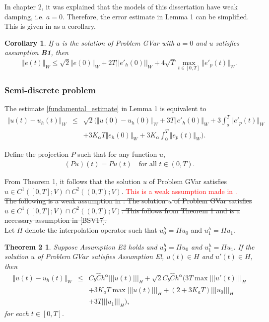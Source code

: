 \documentclass[../../main.tex]{subfiles}
\begin{document}
In chapter 2, it was explained that the models of this dissertation have weak damping, i.e. $a = 0$. Therefore, the error estimate in Lemma 1 can be simplified. This is given in \cite{BV13} as a corollary.

\newtheorem{col_1}{Corollary}
\begin{col_1}
	If $u$ is the solution of Problem GVar with $a = 0$ and $u$ satisfies assumption \textbf{B1}, then
	\begin{eqnarray}
		\Vert e(t)\Vert_{W} \leq \sqrt{2} \Vert e(0) \Vert_W + 2T||e'_h(0)||_W + 4\sqrt{T}\max_{t \in [0,T]} \Vert e'_p(t) \Vert_W.
	\end{eqnarray}
\end{col_1}

\subsubsection{Semi-discrete problem}
The estimate \eqref{fundamental_estimate} in Lemma 1 is equivalent to
\begin{eqnarray*}
	\Vert u(t) - u_h(t) \Vert_{W} &\leq& \sqrt{2} \biggl( \Vert u(0) - u_h(0) \Vert_W + 3T\Vert e'_h(0) \Vert_W + 3 \int_o^T \Vert e'_p(t)\Vert_W\nonumber \\
	&& + 3K_\alpha T \Vert e_h(0) \Vert_W + 3K_\alpha \int_0^T \Vert e_p(t) \Vert_W \biggr).
\end{eqnarray*}


Define the projection $P$ such that for any function $u$,
\begin{eqnarray*}
	(Pu)(t) = Pu(t) \ \ \ \textrm{ for all } t \in (0,T).
\end{eqnarray*}



From Theorem 1, it follows that the solution $u$ of Problem GVar satisfies $u \in C^1([0,T]; V) \cap C^2((0,T);V)$. \textcolor{red}{This is a weak assumption made in \cite{BV13}.}\\

\sout{The following is a weak assumption in \cite{BV13}: The solution $u$ of Problem GVar satisfies $u \in C^1([0,T]; V) \cap C^2((0,T);V)$. This follows from Theorem 1 and is a necessary assumption in [BSV17].}\\

Let $\Pi$ denote the interpolation operator such that $u_0^h = \Pi u_0$ and $u_1^h = \Pi u_1$.

\newtheorem*{DC_Thm4}{Theorem 2}
\begin{DC_Thm4}
	Suppose Assumption E2 holds and $u_{0}^{h}=\Pi u_{0}$ and $u_{1}^{h}=\Pi u_{1}.$ If the solution $u$ of Problem $GVar$ satisfies Assumption El, $u(t)\in H$ and $u'(t)\in H$, then
	\begin{eqnarray*}
		\Vert u(t)-u_{h}(t)\Vert_{W} & \leq & C_{b} \hat{C}h^{\alpha}|||u(t)|||_{H}+\sqrt{2}C_{b}\hat{C}h^{\alpha}(3T\max|||u'(t)|||_{H}\\
		& & +3K_{a}T\max|||u(t)|||_{H}+(2+3K_{a}T)|||u_{0}|||_{H} \\
		& & +3T|||u_{1}|||_{H}) ,
	\end{eqnarray*} for each $t\in[0, T].$
\end{DC_Thm4}
\end{document}
